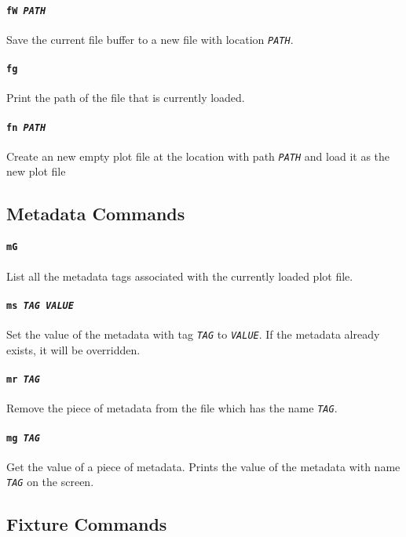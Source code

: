 \documentclass[a4paper]{article}
\begin{document}
\paragraph{\texttt{fW \textit{PATH}}}
Save the current file buffer to a new file with location 
\texttt{\textit{PATH}}.

\paragraph{\texttt{fg}}
Print the path of the file that is currently loaded.

\paragraph{\texttt{fn \textit{PATH}}}
Create an new empty plot file at the location with path \texttt{\textit{PATH}} 
and load it as the new plot file

\subsection{Metadata Commands}

\paragraph{\texttt{mG}}
List all the metadata tags associated with the currently loaded plot file.

\paragraph{\texttt{ms \textit{TAG VALUE}}}
Set the value of the metadata with tag \texttt{\textit{TAG}} to 
\texttt{\textit{VALUE}}. If the metadata already exists, it will be 
overridden.

\paragraph{\texttt{mr \textit{TAG}}}
Remove the piece of metadata from the file which has the name 
\texttt{\textit{TAG}}.

\paragraph{\texttt{mg \textit{TAG}}}
Get the value of a piece of metadata. Prints the value of the metadata with
name \texttt{\textit{TAG}} on the screen.

\subsection{Fixture Commands}
\end{document}
